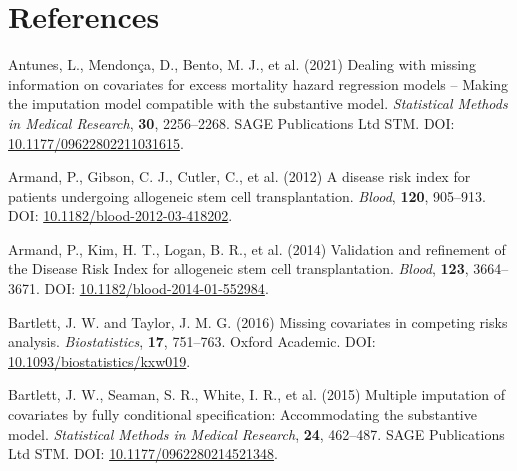\documentclass[
  letterpaper,
  DIV=11,
  numbers=noendperiod]{scrreprt}
\newlength{\cslhangindent}
\newlength{\cslentryspacingunit} %
\newenvironment{CSLReferences}[2] %
 {%
  \setlength{\parindent}{0pt}
  \ifodd #1
  \let\oldpar\par
  \def\par{\hangindent=\cslhangindent\oldpar}
  \fi
  \setlength{\parskip}{#2\cslentryspacingunit}
 }%
 {}
\begin{document}
\hypertarget{references}{%
\section*{References}\label{references}}


\hypertarget{refs-2}{}
\begin{CSLReferences}{1}{0}
\leavevmode{}%
Antunes, L., Mendonça, D., Bento, M. J., et al. (2021) Dealing with
missing information on covariates for excess mortality hazard regression
models -- {Making} the imputation model compatible with the substantive
model. \emph{Statistical Methods in Medical Research}, \textbf{30},
2256--2268. SAGE Publications Ltd STM. DOI:
\href{https://doi.org/10.1177/09622802211031615}{10.1177/09622802211031615}.

\leavevmode{}%
Armand, P., Gibson, C. J., Cutler, C., et al. (2012) A disease risk
index for patients undergoing allogeneic stem cell transplantation.
\emph{Blood}, \textbf{120}, 905--913. DOI:
\href{https://doi.org/10.1182/blood-2012-03-418202}{10.1182/blood-2012-03-418202}.

\leavevmode{}%
Armand, P., Kim, H. T., Logan, B. R., et al. (2014) Validation and
refinement of the {Disease Risk Index} for allogeneic stem cell
transplantation. \emph{Blood}, \textbf{123}, 3664--3671. DOI:
\href{https://doi.org/10.1182/blood-2014-01-552984}{10.1182/blood-2014-01-552984}.

\leavevmode{}%
Bartlett, J. W. and Taylor, J. M. G. (2016) Missing covariates in
competing risks analysis. \emph{Biostatistics}, \textbf{17}, 751--763.
Oxford Academic. DOI:
\href{https://doi.org/10.1093/biostatistics/kxw019}{10.1093/biostatistics/kxw019}.

\leavevmode{}%
Bartlett, J. W., Seaman, S. R., White, I. R., et al. (2015) Multiple
imputation of covariates by fully conditional specification:
{Accommodating} the substantive model. \emph{Statistical Methods in
Medical Research}, \textbf{24}, 462--487. SAGE Publications Ltd STM.
DOI:
\href{https://doi.org/10.1177/0962280214521348}{10.1177/0962280214521348}.


\end{CSLReferences}
\end{document}
